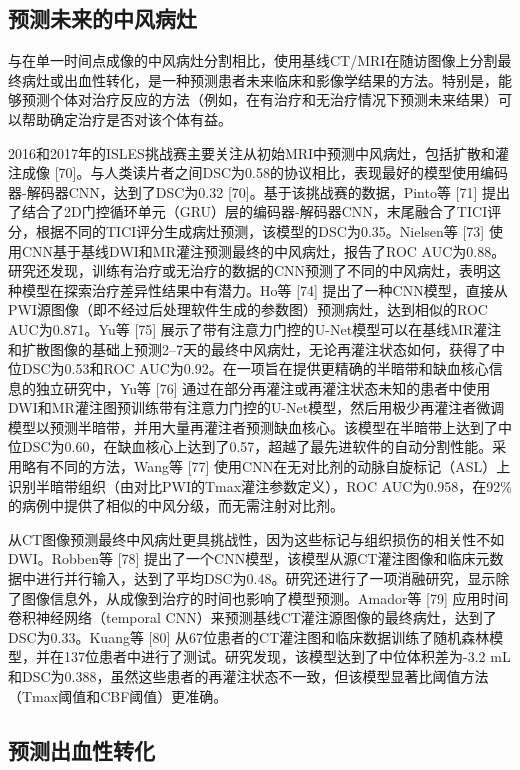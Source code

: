 \documentclass[11pt]{article}
\begin{document}
\subsection{\kaishu  预测未来的中风病灶}

与在单一时间点成像的中风病灶分割相比，使用基线CT/MRI在随访图像上分割最终病灶或出血性转化，是一种预测患者未来临床和影像学结果的方法。特别是，能够预测个体对治疗反应的方法（例如，在有治疗和无治疗情况下预测未来结果）可以帮助确定治疗是否对该个体有益。

2016和2017年的ISLES挑战赛主要关注从初始MRI中预测中风病灶，包括扩散和灌注成像 [70]。与人类读片者之间DSC为0.58的协议相比，表现最好的模型使用编码器-解码器CNN，达到了DSC为0.32 [70]。基于该挑战赛的数据，Pinto等 [71] 提出了结合了2D门控循环单元（GRU）层的编码器-解码器CNN，末尾融合了TICI评分，根据不同的TICI评分生成病灶预测，该模型的DSC为0.35。Nielsen等 [73] 使用CNN基于基线DWI和MR灌注预测最终的中风病灶，报告了ROC AUC为0.88。研究还发现，训练有治疗或无治疗的数据的CNN预测了不同的中风病灶，表明这种模型在探索治疗差异性结果中有潜力。Ho等 [74] 提出了一种CNN模型，直接从PWI源图像（即不经过后处理软件生成的参数图）预测病灶，达到相似的ROC AUC为0.871。Yu等 [75] 展示了带有注意力门控的U-Net模型可以在基线MR灌注和扩散图像的基础上预测2–7天的最终中风病灶，无论再灌注状态如何，获得了中位DSC为0.53和ROC AUC为0.92。在一项旨在提供更精确的半暗带和缺血核心信息的独立研究中，Yu等 [76] 通过在部分再灌注或再灌注状态未知的患者中使用DWI和MR灌注图预训练带有注意力门控的U-Net模型，然后用极少再灌注者微调模型以预测半暗带，并用大量再灌注者预测缺血核心。该模型在半暗带上达到了中位DSC为0.60，在缺血核心上达到了0.57，超越了最先进软件的自动分割性能。采用略有不同的方法，Wang等 [77] 使用CNN在无对比剂的动脉自旋标记（ASL）上识别半暗带组织（由对比PWI的Tmax灌注参数定义），ROC AUC为0.958，在92\%的病例中提供了相似的中风分级，而无需注射对比剂。

从CT图像预测最终中风病灶更具挑战性，因为这些标记与组织损伤的相关性不如DWI。Robben等 [78] 提出了一个CNN模型，该模型从源CT灌注图像和临床元数据中进行并行输入，达到了平均DSC为0.48。研究还进行了一项消融研究，显示除了图像信息外，从成像到治疗的时间也影响了模型预测。Amador等 [79] 应用时间卷积神经网络（temporal CNN）来预测基线CT灌注源图像的最终病灶，达到了DSC为0.33。Kuang等 [80] 从67位患者的CT灌注图和临床数据训练了随机森林模型，并在137位患者中进行了测试。研究发现，该模型达到了中位体积差为-3.2 mL和DSC为0.388，虽然这些患者的再灌注状态不一致，但该模型显著比阈值方法（Tmax阈值和CBF阈值）更准确。

\subsection{\kaishu 预测出血性转化}
\end{document}

